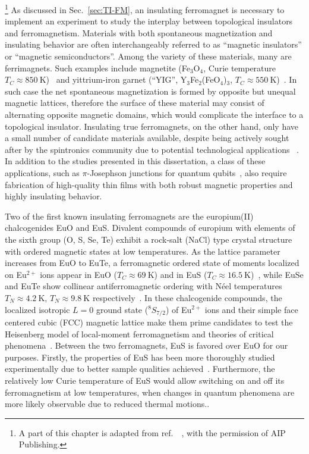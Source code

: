 \footnote[2]{A part of this chapter is adapted from ref.~\cite{EuS_PLD}~, with the permission of AIP Publishing.}%
As discussed in Sec.~\ref{sec:TI-FM}, an insulating ferromagnet is necessary to implement an experiment to study the interplay between topological insulators and ferromagnetism. Materials with both spontaneous magnetization and insulating behavior are often interchangeably referred to as ``magnetic insulators'' or ``magnetic semiconductors''. Among the variety of these materials, many are ferrimagnets. Such examples include magnetite (Fe$_3$O$_4$, Curie temperature $T_C\approx850~\mathrm{K}$)~\cite{Neel1948} and yittrium-iron garnet (``YIG'', Y$_3$Fe$_2$(FeO$_4$)$_3$, $T_C\approx550~\mathrm{K}$)~\cite{YIG}. In such case the net spontaneous magnetization is formed by opposite but unequal magnetic lattices, therefore the surface of these material may consist of alternating opposite magnetic domains, which would complicate the interface to a topological insulator. Insulating true ferromagnets, on the other hand, only have a small number of candidate materials available, despite being actively sought after by the spintronics community due to potential technological applications \cite[][p.~329]{kittel}~\cite{Yi2014, Wolf2001, EuS_spin_filter, EuS_app1, EuS_spin_filter2}. In addition to the studies presented in this dissertation, a class of these applications, such as $\pi$-Josephson junctions for quantum qubits~\cite{pi_qubit, pi_junction, Jing}, also require fabrication of high-quality thin films with both robust magnetic properties and highly insulating behavior.

Two of the first known insulating ferromagnets are the europium(II) chalcogenides EuO and EuS. Divalent compounds of europium with elements of the sixth group (O, S, Se, Te) exhibit a rock-salt (NaCl) type crystal structure with ordered magnetic states at low temperatures. As the lattice parameter increases from EuO to EuTe, a ferromagnetic ordered state of moments localized on Eu$^{2+}$ ions appear in EuO ($T_C\approx69~\mathrm{K}$) and in EuS ($T_C\approx16.5~\mathrm{K}$)~\cite{EuO_TC, EuS_Shafer, EuS_specific_heat}, while EuSe and EuTe show collinear antiferromagnetic ordering with N\'eel temperatures $T_N\approx4.2~\mathrm{K}$, $T_N\approx9.8~\mathrm{K}$ respectively~\cite{EuSe_AF, EuTe_AF}. In these chalcogenide compounds, the localized isotropic $L=0$ ground state ($^8S_{7/2}$) of Eu$^{2+}$ ions and their simple face centered cubic (FCC) magnetic lattice make them prime candidates to test the Heisenberg model of local-moment ferromagnetism and theories of critical phenomena~\cite{divalent_Eu, EuX_indirect_exchange, EuS_neighbor_exchange, EuS_critical, EuS_neutron, EuS_spin_wave}. Between the two ferromagnets, EuS is favored over EuO for our purposes. Firstly, the properties of EuS has been more thoroughly studied experimentally due to better sample qualities achieved~\cite{EuS_band_th2}. Furthermore, the relatively low Curie temperature of EuS would allow switching on and off its ferromagnetism at low temperatures, when changes in quantum phenomena are more likely observable due to reduced thermal motions..

